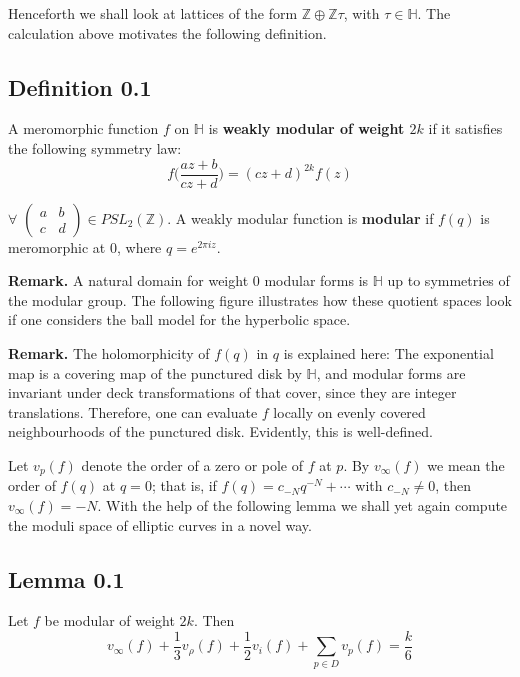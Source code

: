 \documentclass[11pt,a4paper]{article}
\begin{document}

Henceforth we shall look at lattices of the form $\mathbb{Z}\oplus\mathbb{Z}\tau$, with $\tau \in \mathbb{H}$. The calculation above motivates the following definition.

\subsection*{Definition 0.1} A meromorphic function $f$ on $\mathbb{H}$ is \textbf{weakly modular of weight $2k$} if it satisfies the following symmetry law:
$$f\bigg(\frac{az+b}{cz+d}\bigg) = (cz+d)^{2k}f(z)$$

$\forall$ $\begin{pmatrix}
    a&b\\c&d
\end{pmatrix}\in PSL_2(\mathbb{Z})$. A weakly modular function is \textbf{modular} if $f(q)$ is meromorphic at $0$, where $q = e^{2\pi i z}$.


\textbf{Remark.} A natural domain for weight $0$ modular forms is $\mathbb{H}$ up to symmetries of the modular group. The following figure illustrates how these quotient spaces look if one considers the ball model for the hyperbolic space.

\textbf{Remark.} The holomorphicity of $f(q)$ in $q$ is explained here: The exponential map is a covering map of the punctured disk by $\mathbb{H}$, and modular forms are invariant under deck transformations of that cover, since they are integer translations. Therefore, one can evaluate $f$ locally on evenly covered neighbourhoods of the punctured disk. Evidently, this is well-defined.

Let $v_p(f)$ denote the order of a zero or pole of $f$ at $p$. By $v_{\infty}(f)$ we mean the order of $f(q)$ at $q=0$; that is, if $f(q)=c_{-N}q^{-N}+\cdots$ with $c_{-N}\neq0$, then $v_{\infty}(f)=-N$. With the help of the following lemma we shall yet again compute the moduli space of elliptic curves in a novel way.


\subsection*{Lemma 0.1} Let $f$ be modular of weight $2k$. Then
$$v_{\infty}(f) +\frac{1}{3}v_{\rho}(f) + \frac{1}{2}v_{i}(f) + \sum_{p\in D} v_p(f) = \frac{k}{6}$$
\end{document}
